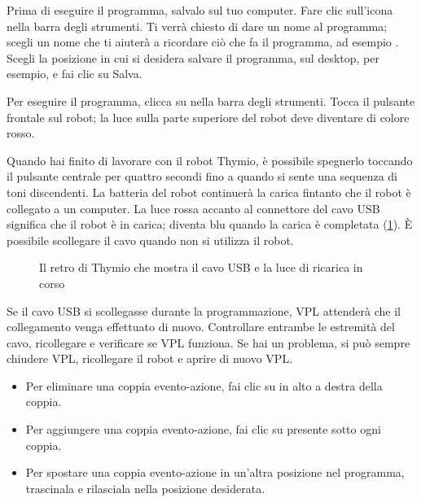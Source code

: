 
Prima di eseguire il programma, salvalo sul tuo computer.
Fare clic sull'icona 
nella barra degli strumenti. Ti verrà chiesto di dare un nome al programma; scegli un
nome che ti aiuterà a ricordare ciò che fa il programma, ad esempio
.
Scegli la posizione in cui si desidera salvare il programma, sul desktop, per esempio, e fai clic su Salva.



Per eseguire il programma, clicca su  nella barra degli strumenti. Tocca
il pulsante frontale sul robot; la luce sulla parte superiore del robot deve
diventare di colore rosso.



Quando hai finito di lavorare con il robot Thymio, è possibile spegnerlo
toccando il pulsante centrale per quattro secondi fino a quando
si sente una sequenza di toni discendenti. La batteria del robot
continuerà la carica fintanto che il robot è collegato a un computer. La
luce rossa accanto al connettore del cavo USB significa che il robot è in
carica; diventa blu quando la carica è completata (\cref{fig.back}).
È possibile scollegare il cavo quando non si utilizza il robot.


\begin{figure}
\begin{center}
\caption{Il retro di Thymio che mostra il cavo USB e la luce di ricarica in corso}\label{fig.back}
\end{center}
\end{figure}

Se il cavo USB si scollegasse durante la programmazione, VPL attenderà che il collegamento venga effettuato di nuovo.
Controllare entrambe le estremità del cavo, ricollegare e verificare se VPL funziona.
Se hai un problema, si può sempre chiudere VPL, ricollegare il robot e aprire di nuovo VPL.


\begin{itemize}
\item Per eliminare una coppia evento-azione, fai clic su  in alto a destra della coppia.
\item Per aggiungere una coppia evento-azione, fai clic su  presente sotto ogni coppia.
\item Per spostare una coppia evento-azione in un'altra posizione nel programma, trascinala e rilasciala nella posizione desiderata.
\end{itemize}

